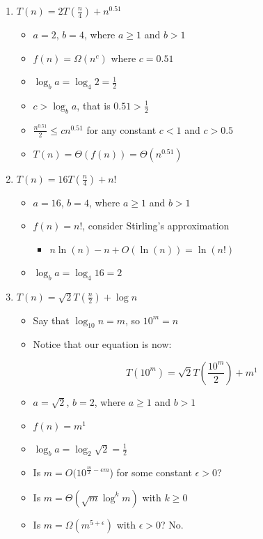 \documentclass[11pt]{article}
\begin{document}
\begin{enumerate}[label=\Alph*.]
	\item $T(n) = 2T(\frac{n}{4}) + n^{0.51}$
	
	\begin{itemize}
	
		\item $a = 2$, $b = 4$, where $a \geq 1$ and $b > 1$
		\item $f(n) = \Omega(n^c)$ where $c = 0.51$
		\item $\log_b a = \log_4 2 = \frac{1}{2}$
		\item $c > \log_b a$, that is $0.51 > \frac{1}{2}$
		\item $\frac{n^{0.51}}{2} \leq c n^{0.51}$ for any constant $c < 1$ and $c > 0.5$
		\item $T (n) = \Theta(f(n)) = \Theta (n^{0.51})$
	
	\end{itemize}
	
	\item $T(n) = 16 T(\frac{n}{4}) + n!$
	
	\begin{itemize}
	
		\item $a = 16$, $b = 4$, where $a \geq 1$ and $b > 1$
		\item $f(n) = n!$, consider Stirling's approximation
		
		\begin{itemize}
		
			\item $n\ln(n) - n +O(\ln(n)) = \ln(n!)$
		
		\end{itemize}
		
		\item $\log_b a = \log_4 16 = 2$
	
	\end{itemize}
	
	\item $T(n) = \sqrt{2} T(\frac{n}{2}) + \log n$
	
	\begin{itemize}
	
		\item Say that $\log_{10} n = m$, so $10^m = n$
		\item Notice that our equation is now:
		
			$$T(10^m) = \sqrt{2} T\left(\frac{10^m}{2}\right) + m^1$$
		
		\item $a = \sqrt{2}$, $b = 2$, where $a \geq 1$ and $b > 1$
		\item $f(n) = m^1$
		\item $\log_b a = \log_2 \sqrt{2} = \frac{1}{2}$
		\item Is $m = O(10^{\frac{m}{2} - \epsilon m}$) for some constant $\epsilon > 0$?
		\item Is $m = \Theta(\sqrt{m} \log^k m)$ with $k \geq 0$
		\item Is $m = \Omega(m^{5+\epsilon})$ with $\epsilon > 0$? No.
	

\end{itemize}
\end{enumerate}
\end{document}
